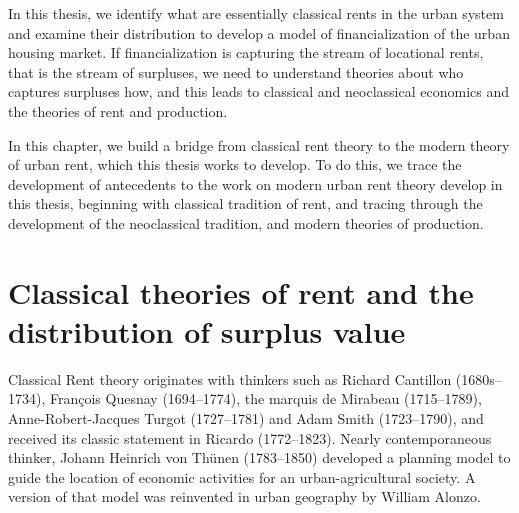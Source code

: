 In this thesis, we identify what are essentially \glspl{classical rent} in the urban system and examine their distribution to develop a model of financialization of the urban housing market. 
If financialization is capturing the stream of \glspl{locational rent}, that is the stream of surpluses, we need to understand theories about who captures surpluses how, and this leads to classical and neoclassical economics and the theories of rent and production.

In this chapter, we build a bridge from \gls{classical rent theory} to the modern theory of urban rent, which this thesis works to develop. 
To do this, we trace the development of antecedents to the work on modern urban rent theory develop in this thesis, beginning with classical tradition of rent, and tracing through the development of the neoclassical tradition, and modern theories of production. 




 
\section{Classical theories of rent and the distribution of surplus value}
Classical Rent theory originates with  thinkers such as Richard Cantillon (1680s--1734), 
Fran\c{c}ois Quesnay (1694--1774), the marquis de Mirabeau (1715--1789), Anne-Robert-Jacques
Turgot (1727--1781) and 
Adam Smith (1723--1790), and received its classic statement
in Ricardo (1772--1823). Nearly contemporaneous thinker, 
Johann Heinrich von Th\"unen (1783--1850) developed a planning model to guide the location of economic activities for an urban-agricultural society. A version of that model was reinvented in urban geography by William Alonzo.


